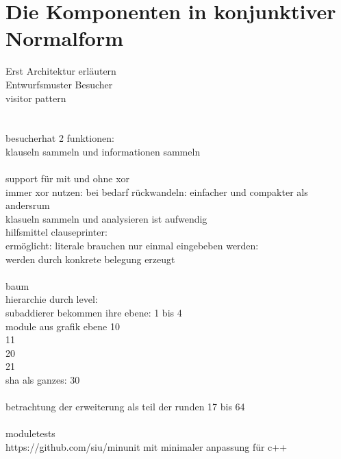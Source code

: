 \chapter{Die Komponenten in konjunktiver Normalform}
\label{chp:knf}

Erst Architektur erläutern\\
Entwurfsmuster Besucher\\
visitor pattern\\
\cite[301]{visitor}\\
~\\
besucherhat 2 funktionen:\\
klauseln sammeln und informationen sammeln\\
~\\
support für mit und ohne xor\\
immer xor nutzen: bei bedarf rückwandeln: einfacher und compakter als andersrum\\
klasueln sammeln und analysieren ist aufwendig
~\\
hilfsmittel clauseprinter:\\
ermöglicht: literale brauchen nur einmal eingebeben werden:\\
werden durch konkrete belegung erzeugt\\
~\\
baum\\
hierarchie durch level:\\
subaddierer bekommen ihre ebene: 1 bis 4\\
module aus grafik ebene 10\\
11\\
20\\
21\\
sha als ganzes: 30\\
~\\
betrachtung der erweiterung als teil der runden 17 bis 64\\
~\\
moduletests\\
https://github.com/siu/minunit mit minimaler anpassung für c++








